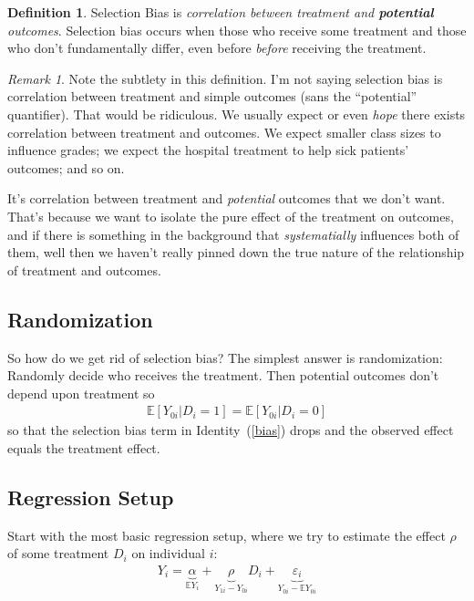 \documentclass[12pt]{article}
\theoremstyle{plain}
\theoremstyle{definition}
\newtheorem{defn}[thm]{Definition}
\theoremstyle{remark}
\newtheorem*{rmk}{Remark}
\begin{document}
\begin{defn}
\label{defn:selbias}
Selection Bias is \emph{correlation between treatment and
\textbf{potential} outcomes}. Selection bias occurs when those who
receive some treatment and those who don't fundamentally differ, even
before \emph{before} receiving the treatment.
\end{defn}

\begin{rmk}
Note the subtlety in this definition. I'm not saying selection bias is
correlation between treatment and simple outcomes (sans the
``potential'' quantifier). That would be ridiculous. We usually expect
or even \emph{hope} there exists correlation between treatment and
outcomes. We expect smaller class sizes to influence grades; we expect the hospital treatment to help sick patients' outcomes; and so on.

It's correlation between treatment and \emph{potential} outcomes that we
don't want. That's because we want to isolate the pure effect of the
treatment on outcomes, and if there is something in the background that
\emph{systematially} influences both of them, well then we haven't
really pinned down the true nature of the relationship of treatment and
outcomes.
\end{rmk}

\subsection{Randomization}

So how do we get rid of selection bias? The simplest answer is
randomization: Randomly decide who receives the treatment. Then
potential outcomes don't depend upon treatment so
\begin{align*}
  \mathbb{E}[Y_{0i} | D_i=1]
  =\mathbb{E}[Y_{0i} | D_i=0]
\end{align*}
so that the selection bias term in Identity~(\ref{bias}) drops and the
observed effect equals the treatment effect.

\subsection{Regression Setup}

Start with the most basic regression setup, where we try to estimate the
effect $\rho$ of some treatment $D_i$ on individual $i$:
\begin{align}
  Y_i =
  \underbrace{\alpha}_{\mathbb{E}Y_i}
  + \underbrace{\rho}_{Y_{1i} - Y_{0i}} D_i
  + \underbrace{\varepsilon_i}_{Y_{0i}-\mathbb{E}Y_{0i}}
  \label{basic}
\end{align}
\end{document}
